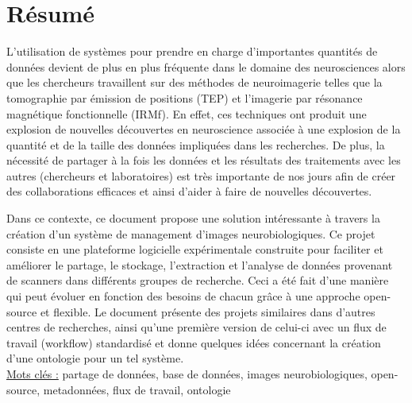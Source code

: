 \section*{R\'esum\'e}
\vspace{0.2cm}
\par
L'utilisation de syst\`emes pour prendre en charge d'importantes quantit\'es de donn\'ees devient de plus en plus fr\'equente dans le domaine des neurosciences alors que les chercheurs travaillent sur des m\'ethodes de neuroimagerie telles que la tomographie par \'emission de positions (TEP) et l'imagerie par r\'esonance magn\'etique fonctionnelle (IRMf). En effet, ces techniques ont produit une explosion de nouvelles d\'ecouvertes en neuroscience associ\'ee \`a une explosion de la quantit\'e et de la taille des donn\'ees impliqu\'ees dans les recherches. De plus, la n\'ecessit\'e de partager \`a la fois les donn\'ees et les r\'esultats des traitements avec les autres (chercheurs et laboratoires) est tr\`es importante de nos jours afin de cr\'eer des collaborations efficaces et ainsi d'aider \`a faire de nouvelles d\'ecouvertes.
\par
Dans ce contexte, ce document propose une solution int\'eressante \`a travers la cr\'eation d'un syst\`eme de management d'images neurobiologiques. Ce projet consiste en une plateforme logicielle exp\'erimentale construite pour faciliter et am\'eliorer le partage, le stockage, l'extraction et l'analyse de donn\'ees provenant de scanners dans diff\'erents groupes de recherche. Ceci a \'et\'e fait d'une mani\`ere qui peut \'evoluer en fonction des besoins de chacun gr\^ace \`a une approche open-source et flexible. Le document pr\'esente des projets similaires dans d'autres centres de recherches, ainsi qu'une premi\`ere version de celui-ci avec un flux de travail (workflow) standardis\'e et donne quelques id\'ees concernant la cr\'eation d'une ontologie pour un tel syst\`eme.
\vspace{0.3cm}\\
\underline{Mots cl\'es :} partage de donn\'ees, base de donn\'ees, images neurobiologiques, open-source, metadonn\'ees, flux de travail, ontologie